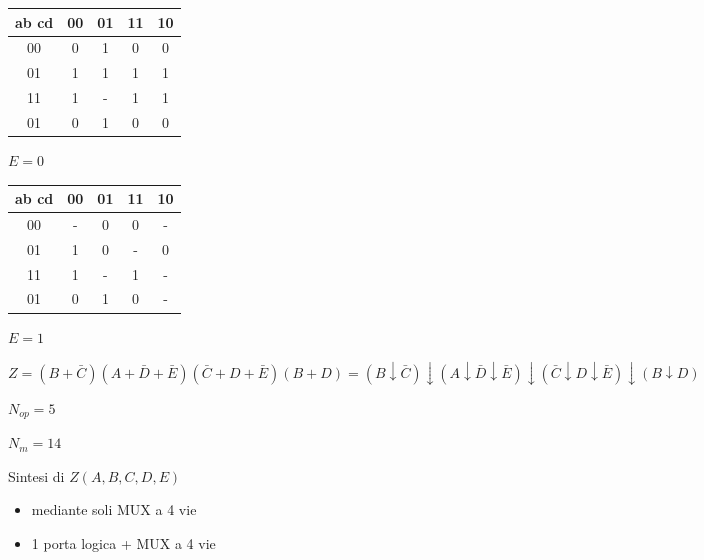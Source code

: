 \documentclass{article}
\begin{document}
\begin{minipage}{0.4\textwidth}
    \begin{center}
        \begin{tabular}{c|c|c|c|c|}
            ab cd & 00 & 01 & 11 & 10\\
            \hline
            00 &  0 & 1 & 0 & 0\\
            \hline
            01 & 1 & 1 & 1 & 1\\
            \hline
            11 & 1 & - & 1 & 1\\
            \hline
            01 & 0 & 1 & 0 & 0\\
            \hline
        \end{tabular}

        $E =0$
    \end{center}
\end{minipage}
\begin{minipage}{0.4\textwidth}
    \begin{center}
        \begin{tabular}{c|c|c|c|c|}
            ab cd & 00 & 01 & 11 & 10\\
            \hline
            00 &  - & 0 & 0 & -\\
            \hline
            01 & 1 & 0 & - & 0\\
            \hline
            11 & 1 & - & 1 & -\\
            \hline
            01 & 0 & 1 & 0 & -\\
            \hline
        \end{tabular}

        $E = 1$
    \end{center}
\end{minipage}

\[ Z = (B + \bar{C})(A + \bar{D} + \bar{E})(\bar{C} + D + \bar{E})(B + D) = (B \downarrow \bar{C}) \downarrow (A\downarrow \bar{D}\downarrow\bar{E})\downarrow(\bar{C}\downarrow D\downarrow \bar{E})\downarrow (B\downarrow D)\]

$N_{op} = 5$

$N_{m} = 14$

Sintesi di $Z(A, B, C, D, E) $

\begin{itemize}
    \item mediante soli MUX a 4 vie
    \item 1 porta logica + MUX a 4 vie
\end{itemize}

\end{document}
